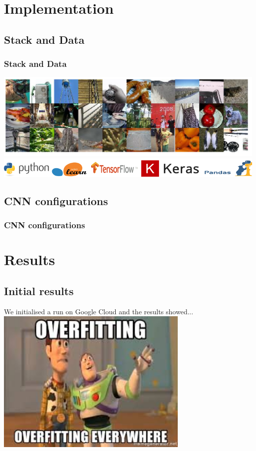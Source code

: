 \documentclass{beamer}
\begin{document}
\section{Implementation}
\subsection{Stack and Data}
\begin{frame}
  \frametitle{Stack and Data}
  \centering
  \includegraphics[width=\textwidth]{images/samples.png}
  \vspace{0.05\textheight}
  \includegraphics[width=\textwidth]{images/logosPNG.png}
\end{frame}

\subsection{CNN configurations}
\begin{frame}
  \frametitle{CNN configurations}
  
\end{frame}

\section{Results}
\subsection{Initial results}
\begin{frame}
  \centering
  We initialised a run on Google Cloud and the results showed...\pause
  \vspace{0.02\textheight}
  \includegraphics[width=0.7\textwidth]{images/overfitting.jpeg}
\end{frame}
\end{document}
